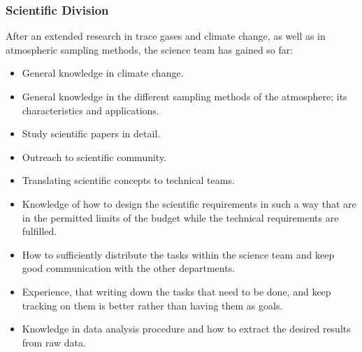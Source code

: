 \documentclass[a4paper,12pt,twoside]{article}
\begin{document}
\subsubsection{Scientific Division}
After an extended research in trace gases and climate change, as well as in atmospheric sampling methods, the science team has gained so far: 
\begin{itemize}
    \item General knowledge in climate change.
    \item General knowledge in the different sampling methods of the atmosphere; its characteristics and applications.
    \item Study scientific papers in detail.
    \item Outreach to scientific community.
    \item Translating scientific concepts to technical teams.
    \item Knowledge of how to design the scientific requirements in such a way that are in the permitted limits of the budget while the technical requirements are fulfilled.   
    \item How to sufficiently distribute the tasks within the science team and keep good communication with the other departments. 
    \item Experience, that writing down the tasks that need to be done, and keep tracking on them is better rather than having them as goals.   
    \item Knowledge in data analysis procedure and how to extract the desired results from raw data.
\end{itemize}
\end{document}
